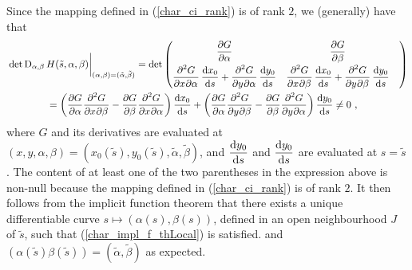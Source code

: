 \begin{rmk}
Since the mapping defined in (\ref{char_ci_rank}) is of rank $2$, we
(generally) have that
\begin{align*}
&\det \diff_{\alpha,\beta} H(\tilde{s},\alpha,\beta)
\bigg|_{(\alpha,\beta) = (\tilde{\alpha},\tilde{\beta})}
= \det \begin{pmatrix}
\displaystyle \pdydx{G}{\alpha} & \displaystyle \pdydx{G}{\beta} \\[0.7em]
\displaystyle \pdydxnm{G}{x}{\alpha}{2}{}{}\, \dydx{x_0}{s}
+ \pdydxnm{G}{y}{\alpha}{2}{}{}\, \dydx{y_0}{s} &
\displaystyle \pdydxnm{G}{x}{\beta}{2}{}{}\, \dydx{x_0}{s}
+ \pdydxnm{G}{y}{\beta}{2}{}{}\, \dydx{y_0}{s} &
\end{pmatrix} \\
&\qquad \qquad = \left( \pdydx{G}{\alpha} \pdydxnm{G}{x}{\beta}{2}{}{}
- \pdydx{G}{\beta} \pdydxnm{G}{x}{\alpha}{2}{}{} \right)
\dydx{x_0}{s} + \left(\pdydx{G}{\alpha} \pdydxnm{G}{y}{\beta}{2}{}{}
- \pdydx{G}{\beta} \pdydxnm{G}{y}{\alpha}{2}{}{} \right)
\dydx{y_0}{s} \neq 0 \ ,
\end{align*}
where $G$ and its derivatives are evaluated at
$\displaystyle (x,y,\alpha,\beta)
= \left(x_0\left(\tilde{s}\right), y_0\left(\tilde{s}\right),
\tilde{\alpha}, \tilde{\beta} \right)$,
and $\displaystyle \dydx{y_0}{s}$ and $\displaystyle \dydx{y_0}{s}$
are evaluated at $s = \tilde{s}$.  The content of at
least one of the two parentheses in the expression above is non-null
because the mapping defined in (\ref{char_ci_rank}) is of rank $2$.
It then follows from the implicit function theorem that there exists a
unique differentiable curve $s\mapsto (\alpha(s),\beta(s))$, defined
in an open neighbourhood $J$ of $\tilde{s}$, such that
(\ref{char_impl_f_thLocal}) is satisfied.
and $\displaystyle \left(\alpha\left(\tilde{s}\right)
\beta\left(\tilde{s}\right)\right)
= (\tilde{\alpha},\tilde{\beta})$ as expected.
\end{rmk}

